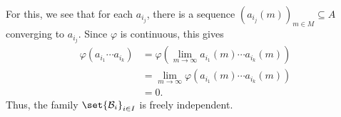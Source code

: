 \documentclass[10pt]{mypackage}
\begin{document}
\begin{solution}
\begin{enumerate}[(i)]
\begin{align*}
      \end{align*}
      For this, we see that for each $a_{i_j}$, there is a sequence $\left( a_{i_j}(m) \right)_{m\in M}\subseteq A$ converging to $a_{i_j}$. Since $\varphi$ is continuous, this gives
      \begin{align*}
        \varphi\left( a_{i_1}\cdots a_{i_k} \right) &= \varphi\left( \lim_{m\rightarrow\infty} a_{i_1}(m)\cdots a_{i_k}(m) \right)\\
                                                    &= \lim_{m\rightarrow\infty} \varphi\left( a_{i_1}(m)\cdots a_{i_k}(m) \right)\\
                                                    &= 0.
      \end{align*}
      Thus, the family $\set{\mathcal{B}_i}_{i\in I}$ is freely independent.
  \end{enumerate}
\end{solution}
\pagebreak
\end{document}
